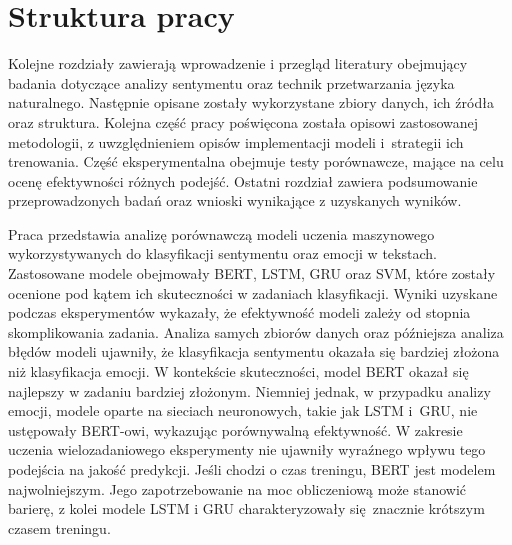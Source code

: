 \documentclass[wmii, inf, mgr]{uwmthesis}
\begin{document}
\section*{Struktura pracy}
Kolejne rozdziały zawierają wprowadzenie i przegląd literatury obejmujący badania dotyczące analizy sentymentu oraz technik przetwarzania języka naturalnego. Następnie opisane zostały wykorzystane zbiory danych, ich źródła oraz struktura. Kolejna część pracy poświęcona została opisowi zastosowanej metodologii, z uwzględnieniem opisów implementacji modeli i~strategii ich trenowania. Część eksperymentalna obejmuje testy porównawcze, mające na celu ocenę efektywności różnych podejść. Ostatni rozdział zawiera podsumowanie przeprowadzonych badań oraz wnioski wynikające z uzyskanych wyników.










\listoffigures
\listoftables

\begin{streszczenie}
Praca przedstawia analizę porównawczą modeli uczenia maszynowego wykorzystywanych do klasyfikacji sentymentu oraz emocji w tekstach. Zastosowane modele obejmowały BERT, LSTM, GRU oraz SVM, które zostały ocenione pod kątem ich skuteczności w zadaniach klasyfikacji. Wyniki uzyskane podczas eksperymentów wykazały, że efektywność modeli zależy od stopnia skomplikowania zadania. Analiza samych zbiorów danych oraz późniejsza analiza błędów modeli ujawniły, że klasyfikacja sentymentu okazała się bardziej złożona niż klasyfikacja emocji. W kontekście skuteczności, model BERT okazał się najlepszy w zadaniu bardziej złożonym. Niemniej jednak, w przypadku analizy emocji, modele oparte na sieciach neuronowych, takie jak LSTM i~GRU, nie ustępowały BERT-owi, wykazując porównywalną efektywność. W zakresie uczenia wielozadaniowego eksperymenty nie ujawniły wyraźnego wpływu tego podejścia na jakość predykcji. Jeśli chodzi o czas treningu, BERT jest modelem najwolniejszym. Jego zapotrzebowanie na moc obliczeniową może stanowić barierę, z kolei modele LSTM i GRU charakteryzowały się~znacznie krótszym czasem treningu.
\end{streszczenie}
\end{document}
